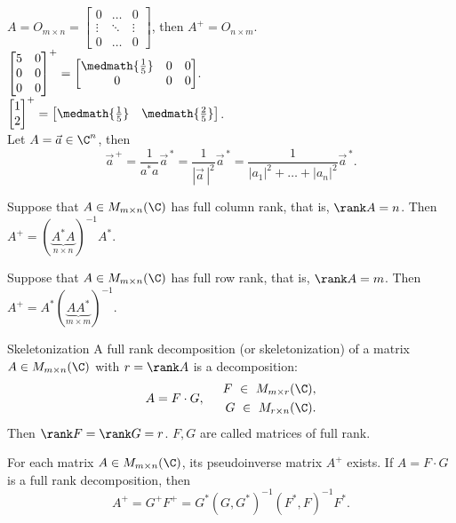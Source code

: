     \Ex $A = O_{m\times n} = \begin{bmatrix}
        0 & \ldots & 0\\
        \vdots & \ddots & \vdots\\
        0 & \ldots & 0
    \end{bmatrix}$, then $A^+ = O_{n\times m}$.\\
    \Ex $\begin{bmatrix}
        5 & 0 \\
        0 & 0 \\
        0 & 0
    \end{bmatrix}^+ = \displaystyle\begin{bmatrix}
        \medmath{\frac{1}{5}} & 0 & 0\\
        0 & 0 & 0
    \end{bmatrix}$.\\
    \Ex $\begin{bmatrix}
        1 \\ 2
    \end{bmatrix}^+ = \begin{bmatrix}
        \medmath{\frac{1}{5}} & \medmath{\frac{2}{5}}
    \end{bmatrix}$.\\
    \Ex Let $A = \vec{a} \in \C^n$, then
    \[\vec{a}^{\, +} = \dfrac{1}{a^*a}\vec{a}^{\, *} 
                     = \dfrac{1}{|\vec{a}\,|^2}\vec{a}^{\, *}
                     = \dfrac{1}{|a_1|^2 + \ldots + |a_n|^2} \vec{a}^{\, *}.\]
    \begin{proposition}{}{}
        Suppose that $A \in M_{m\times n}(\C)$ has full column rank, that is, $\rank A = n$. Then
        $A^+ = (\underbrace{A^*A}_{n\times n})^{-1}A^*.$
    \end{proposition}
    \begin{proposition}{}{}
        Suppose that $A \in M_{m\times n}(\C)$ has full row rank, that is, $\rank A = m$. Then $A^+ = A^* (\underbrace{AA^*}_{m\times m})^{-1}.$
    \end{proposition}
    
    \begin{definition}{Skeletonization}{}
        A full rank decomposition (or skeletonization) of a matrix $A \in M_{m\times n}(\C)$ with $r = \rank A$ is a decomposition:
        \[
            A = F \cdot G, \hspace*{0.5cm} \begin{aligned}
                F\ \in \ M_{m\times r}(\C),\\
                G\ \in \ M_{r\times n}(\C).
            \end{aligned}  
        \]
        Then $\rank F = \rank G = r$. $F, G$ are called matrices of full rank.
    \end{definition}
    \begin{theorema}{}{}
        For each matrix $A \in M_{m\times n}(\C)$, its pseudoinverse matrix $A^+$ exists. If $A = F \cdot G$ is a full rank decomposition, then
        \[
            A^+ = G^+F^+ = G^*\left(G,G^*\right)^{-1} \left(F^*, F\right)^{-1}F^*. 
        \]
    \end{theorema}
